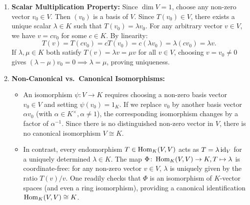 \begin{exercisesolution}
\label{sol:one_dim_endomorphism_canonical_iso}
\begin{enumerate}[label=\textbf{(\alph*)}]
    \item \textbf{Scalar Multiplication Property:}
    Since $\dim V = 1$, choose any non-zero vector $v_0 \in V$. Then $(v_0)$ is a basis of $V$.
    Since $T(v_0) \in V$, there exists a unique scalar $\lambda \in K$ such that $T(v_0) = \lambda v_0$.
    For any arbitrary vector $v \in V$, we have $v = c v_0$ for some $c \in K$. By linearity:
    \[
    T(v) = T(c v_0) = c T(v_0) = c (\lambda v_0) = \lambda (c v_0) = \lambda v.
    \]
    If $\lambda, \mu \in K$ both satisfy $T(v) = \lambda v = \mu v$ for all $v \in V$, choosing $v = v_0 \ne 0$ gives $(\lambda - \mu)v_0 = 0 \implies \lambda = \mu$, proving uniqueness.

    \item \textbf{Non-Canonical vs.~Canonical Isomorphisms:}
    \begin{itemize}
        \item An isomorphism $\psi \colon V \to K$ requires choosing a non-zero basis vector $v_0 \in V$ and setting $\psi(v_0) = 1_K$. If we replace $v_0$ by another basis vector $\alpha v_0$ (with $\alpha \in K^\times, \alpha \ne 1$), the corresponding isomorphism changes by a factor of $\alpha^{-1}$. Since there is no distinguished non-zero vector in $V$, there is no canonical isomorphism $V \cong K$.
        \item In contrast, every endomorphism $T \in \operatorname{Hom}_K(V, V)$ acts as $T = \lambda \operatorname{id}_V$ for a uniquely determined $\lambda \in K$. The map $\Phi \colon \operatorname{Hom}_K(V, V) \to K, T \mapsto \lambda$ is coordinate-free: for any non-zero vector $v \in V$, $\lambda$ is uniquely given by the ratio $T(v)/v$. One readily checks that $\Phi$ is an isomorphism of $K$-vector spaces (and even a ring isomorphism), providing a canonical identification $\operatorname{Hom}_K(V, V) \cong K$.
    \end{itemize}
\end{enumerate}
\end{exercisesolution}

